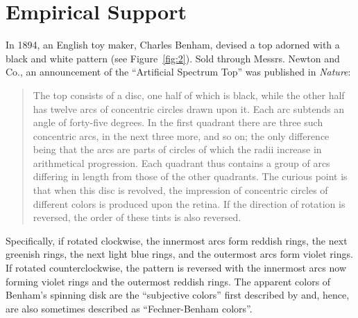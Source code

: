 
\section{Empirical Support} %
\label{sec:empirical_support}
In 1894, an English toy maker, Charles Benham, devised a top adorned with a black and white pattern (see Figure~\ref{fig:2}). Sold through Messrs. Newton and Co., an announcement of the ``Artificial Spectrum Top'' was published in \emph{Nature}:
	\begin{quote}
		The top consists of a disc, one half of which is black, while the other half has twelve arcs of concentric circles drawn upon it. Each arc subtends an angle of forty-five degrees. In the first quadrant there are three such concentric arcs, in the next three more, and so on; the only difference being that the arcs are parts of circles of which the radii increase in arithmetical progression. Each quadrant thus contains a group of arcs differing in length from those of the other quadrants. The curious point is that when this disc is revolved, the impression of concentric circles of different colors is produced upon the retina. If the direction of rotation is reversed, the order of these tints is also reversed. \citep{Benham:1894kx}
	\end{quote}
Specifically, if rotated clockwise, the innermost arcs form reddish rings, the next greenish rings, the next light blue rings, and the outermost arcs form violet rings. If rotated counterclockwise, the pattern is reversed with the innermost arcs now forming violet rings and the outermost reddish rings. The apparent colors of Benham's spinning disk are the ``subjective colors'' first described by \citep{Fechner:1838vn} and, hence, are also sometimes described as ``Fechner-Benham colors''.

